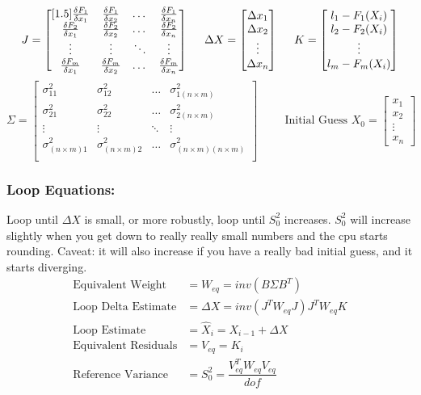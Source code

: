 \[
J = \begin{bmatrix}[1.5]
\frac{\delta F_1}{\delta x_1} & \frac{\delta F_1}{\delta x_2} & \dots & \frac{\delta F_1}{\delta x_n} \\
\frac{\delta F_2}{\delta x_1} & \frac{\delta F_2}{\delta x_2} & \dots & \frac{\delta F_2}{\delta x_n} \\
\vdots & \vdots & \ddots& \vdots \\
\frac{\delta F_m}{\delta x_1} & \frac{\delta F_m}{\delta x_2} & \dots & \frac{\delta F_m}{\delta x_n} \\
\end{bmatrix}
\hspace{0.5cm}
\Delta X = 
\begin{bmatrix}
\Delta x_1 \\ \Delta x_2 \\ \vdots \\ \Delta x_n
\end{bmatrix}
\hspace{0.5cm}
K = 
\begin{bmatrix}
l_1 - F_1(X_i) \\ l_2 - F_2(X_i)\\ \vdots \\ l_m - F_m(X_i)
\end{bmatrix}
\]
\[
\Sigma = 
\begin{bmatrix}
\sigma_{11}^2 & \sigma_{12}^2 & \dots & \sigma_{1(n\times m)}^2 \\ 
\sigma_{21}^2 & \sigma_{22}^2 & \dots & \sigma_{2(n\times m)}^2 \\ 
\vdots & \vdots & \ddots& \vdots \\
\sigma_{(n\times m)1}^2 & \sigma_{(n\times m)2}^2 & \dots & \sigma_{(n\times m)(n\times m)}^2 \\ 
\end{bmatrix}
\hspace{1cm}
\text{Initial Guess } X_0 = 
\begin{bmatrix}
x_1 \\ x_2 \\ \vdots \\ x_n
\end{bmatrix}
\]
\subsubsection{Loop Equations:}
Loop until $\Delta X $ is small, or more robustly, loop until $S_0^2$ increases.  $S_0^2$ will increase slightly when you get down to really really small numbers and the cpu starts rounding.  Caveat: it will also increase if you have a really bad initial guess, and it starts diverging.
\vspace{0.15cm}
\begin{align*}
	\text{Equivalent Weight} &=  W_{eq} = inv(B\Sigma B^T) \\
	\text{Loop Delta Estimate} &= \Delta X = inv(J^TW_{eq}J)J^TW_{eq}K \\
	\text{Loop Estimate} &=  \hat{X}_i = X_{i-1}+\Delta X \\
	\text{Equivalent Residuals} &= V_{eq} = K_i \\
	\text{Reference Variance} &= S_0^2 = \dfrac{V_{eq}^TW_{eq}V_{eq}}{dof}
\end{align*}
